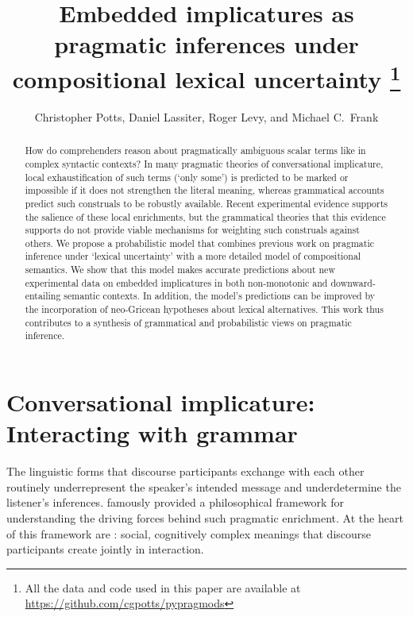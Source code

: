 \documentclass[leqno,12pt]{article}
\begin{document}

\title{Embedded implicatures as pragmatic inferences under compositional lexical uncertainty%
  \thanks{All the data and code used in this paper are available at \url{https://github.com/cgpotts/pypragmods}}}
\author{Christopher Potts, Daniel Lassiter, Roger Levy, and Michael C.~Frank}
\maketitle


\begin{abstract} 
  How do comprehenders reason about pragmatically ambiguous scalar
  terms like  in complex syntactic contexts?  In many
  pragmatic theories of conversational implicature, local
  exhaustification of such terms (`only some') is predicted to be
  marked or impossible if it does not strengthen the literal meaning,
  whereas grammatical accounts predict such construals to be robustly
  available. Recent experimental evidence supports the salience of
  these local enrichments, but the grammatical theories that this
  evidence supports do not provide viable mechanisms for weighting
  such construals against others. We propose a probabilistic model
  that combines previous work on pragmatic inference under `lexical
  uncertainty' with a more detailed model of compositional
  semantics. We show that this model makes accurate predictions about
  new experimental data on embedded implicatures in both non-monotonic
  and downward-entailing semantic contexts. In addition, the model's
  predictions can be improved by the incorporation of neo-Gricean
  hypotheses about lexical alternatives. This work thus contributes to
  a synthesis of grammatical and probabilistic views on pragmatic
  inference.
\end{abstract}


\section{Conversational implicature: Interacting with grammar}\label{sec:introduction}

The linguistic forms that discourse participants exchange with each
other routinely underrepresent the speaker's intended message and
underdetermine the listener's inferences. \citet{Grice75} famously
provided a philosophical framework for understanding the driving
forces behind such pragmatic enrichment. At the heart of this
framework are : social, cognitively
complex meanings that discourse participants create jointly in
interaction.
\end{document}
